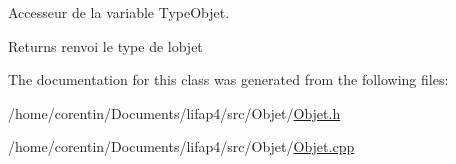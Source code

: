 Accesseur de la variable Type\+Objet. 

\begin{DoxyReturn}{Returns}
renvoi le type de l\textquotesingle{}objet 
\end{DoxyReturn}


The documentation for this class was generated from the following files\+:\begin{DoxyCompactItemize}
\item 
/home/corentin/\+Documents/lifap4/src/\+Objet/\hyperlink{_objet_8h}{Objet.\+h}\item 
/home/corentin/\+Documents/lifap4/src/\+Objet/\hyperlink{_objet_8cpp}{Objet.\+cpp}\end{DoxyCompactItemize}
